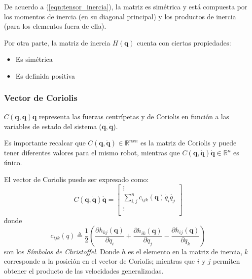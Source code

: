     De acuerdo a (\ref{eqn:tensor_inercia}), la matriz es simétrica y está compuesta por los momentos de inercia (en su diagonal principal) y los productos de inercia 
    (para los elementos fuera de ella). 

    Por otra parte, la matriz de inercia $H(\boldsymbol{q})$ cuenta con ciertas propiedades:
    \begin{itemize}
        \item Es simétrica
        \item Es definida positiva
    \end{itemize}

    \subsubsection{Vector de Coriolis}
    $C(\boldsymbol{q}, \boldsymbol{\dot{q}}) \boldsymbol{\dot{q}}$ representa las fuerzas centrípetas y de Coriolis 
    en función a las variables de estado del sistema ($\boldsymbol{q}, \boldsymbol{\dot{q}}$). 
    
    Es importante recalcar que $C(\boldsymbol{q}, \boldsymbol{\dot{q}}) \in \mathbb{R}^{nxn}$ es la matriz de Coriolis y puede tener diferentes valores para el mismo robot, 
    mientras que $C(\boldsymbol{q}, \boldsymbol{\dot{q}}) \boldsymbol{\dot{q}} \in \mathbb{R}^n$ es único.

    El vector de Coriolis puede ser expresado como:
    \begin{equation}
        \label{eqn:coriolis_vector}
        C(\boldsymbol{q}, \boldsymbol{\dot{q}}) \boldsymbol{\dot{q}} = \begin{bmatrix} \vdots\\
        \sum_{i,j}^{n} c_{ijk}(\boldsymbol{q})\dot{q_{i}}\dot{q_{j}}   \\  \vdots\\ \end{bmatrix}
    \end{equation}
    donde 
    \begin{equation}
        \label{eqn:christoffel}
        c_{ijk}(q) \triangleq \frac{1}{2}\left( \frac{\partial h_{kj}(\boldsymbol{q})}{\partial q_{i}}+\frac{\partial h_{ik}(\boldsymbol{q})}{\partial q_{j}}
        -\frac{\partial h_{ij}(\boldsymbol{q})}{\partial q_{k}} \right)
    \end{equation}
    son los \emph{Símbolos de Christoffel}. Donde $h$ es el elemento en la matriz de inercia, $k$ corresponde a la posición en el vector de Coriolis; 
    mientras que $i$ y $j$ permiten obtener el producto de las velocidades generalizadas. 


